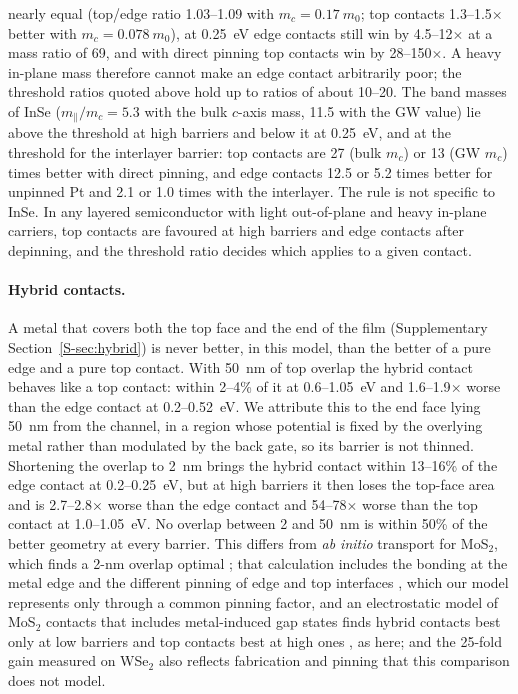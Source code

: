 \documentclass[11pt]{article}
\begin{document}
nearly equal (top/edge ratio 1.03--1.09 with $m_c=0.17~m_0$; top contacts 1.3--1.5$\times$ better with $m_c=0.078~m_0$), at 0.25~eV edge contacts still win by 4.5--12$\times$ at a mass ratio of 69, and with direct pinning top contacts win by 28--150$\times$. A heavy in-plane mass therefore cannot make an edge contact arbitrarily poor; the threshold ratios quoted above hold up to ratios of about 10--20. The band masses of InSe ($m_\parallel/m_c=5.3$ with the bulk $c$-axis mass, 11.5 with the GW value) lie above the threshold at high barriers and below it at 0.25~eV, and at the threshold for the interlayer barrier: top contacts are 27 (bulk $m_c$) or 13 (GW $m_c$) times better with direct pinning, and edge contacts 12.5 or 5.2 times better for unpinned Pt and 2.1 or 1.0 times with the interlayer. The rule is not specific to InSe. In any layered semiconductor with light out-of-plane and heavy in-plane carriers, top contacts are favoured at high barriers and edge contacts after depinning, and the threshold ratio decides which applies to a given contact.

\paragraph{Hybrid contacts.} A metal that covers both the top face and the end of the film (Supplementary Section~\ref{S-sec:hybrid}) is never better, in this model, than the better of a pure edge and a pure top contact. With 50~nm of top overlap the hybrid contact behaves like a top contact: within 2--4\% of it at 0.6--1.05~eV and 1.6--1.9$\times$ worse than the edge contact at 0.2--0.52~eV. We attribute this to the end face lying 50~nm from the channel, in a region whose potential is fixed by the overlying metal rather than modulated by the back gate, so its barrier is not thinned. Shortening the overlap to 2~nm brings the hybrid contact within 13--16\% of the edge contact at 0.2--0.25~eV, but at high barriers it then loses the top-face area and is 2.7--2.8$\times$ worse than the edge contact and 54--78$\times$ worse than the top contact at 1.0--1.05~eV. No overlap between 2 and 50~nm is within 50\% of the better geometry at every barrier. This differs from \emph{ab initio} transport for MoS$_2$, which finds a 2-nm overlap optimal \cite{refpal}; that calculation includes the bonding at the metal edge and the different pinning of edge and top interfaces \cite{refparto}, which our model represents only through a common pinning factor, and an electrostatic model of MoS$_2$ contacts that includes metal-induced gap states finds hybrid contacts best only at low barriers and top contacts best at high ones \cite{refdeylgat25}, as here; and the 25-fold gain measured on WSe$_2$ \cite{refchen25} also reflects fabrication and pinning that this comparison does not model.
\end{document}
